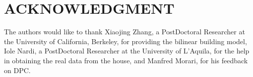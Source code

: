 \section*{ACKNOWLEDGMENT}
The authors would like to thank Xiaojing Zhang, a PostDoctoral Researcher at the University of California, Berkeley, for providing the bilinear building model, Iole Nardi, a PostDoctoral Researcher at the University of L'Aquila, for the help in obtaining the real data from the house, and Manfred Morari, for his feedback on DPC.